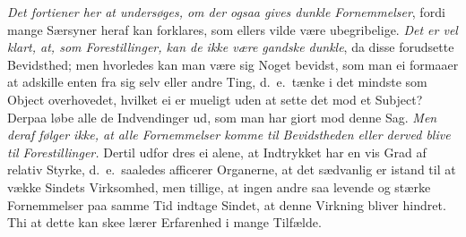 \documentclass[12pt,a4paper]{article}
\newcommand{\opage}[1]{\marginnote{\footnotesize\textit{[#1]}}}
\begin{document}
\emph{Det fortiener her at undersøges, om der ogsaa gives dunkle Fornemmelser},
fordi mange Særsyner heraf kan forklares, som ellers vilde være ubegribelige.
\emph{Det er vel klart, at, som Forestillinger, kan de ikke være gandske dunkle}, da
disse forudsette Bevidsthed; men hvorledes kan man være sig Noget bevidst, som man ei
formaaer at adskille enten fra sig selv eller andre Ting, d.~e.\ tænke i det mindste
som Object overhovedet, hvilket ei er mueligt uden at sette det mod et Subject?
Derpaa løbe alle de Indvendinger ud, som man har giort mod denne Sag. \emph{Men deraf
følger ikke, at alle Fornemmelser komme til Bevidstheden eller derved blive til
Forestillinger.} Dertil udfor%
\opage{49}dres ei alene, at Indtrykket har en vis Grad af relativ Styrke, d.~e.\ saaledes
afficerer Organerne, at det sædvanlig er istand til at vække Sindets Virksomhed, men
tillige, at ingen andre saa levende og stærke Fornemmelser paa samme Tid indtage
Sindet, at denne Virkning bliver hindret. Thi at dette kan skee lærer Erfarenhed i
mange Tilfælde.
\end{document}

